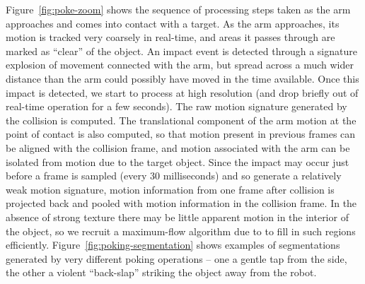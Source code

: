 



Figure~\ref{fig:poke-zoom} shows the sequence of processing steps
taken as the arm approaches and comes into contact with a target.  As
the arm approaches, its motion is tracked very coarsely in real-time,
and areas it passes through are marked as ``clear'' of the object.  An impact event
is detected through a signature explosion of movement connected with
the arm, but spread across a much wider distance than the arm could
possibly have moved in the time available.  Once this impact is detected, we
start to process at high resolution (and drop briefly out of real-time
operation for a few seconds).  The raw motion signature generated by
the collision is computed.  The translational component of the arm
motion at the point of contact is also computed, so that motion present in
previous frames can be aligned with the collision frame, and motion 
associated with the arm can be isolated from motion
due to the target object.  Since the impact may occur just before a
frame is sampled (every 30 milliseconds) and so generate a relatively
weak motion signature, motion information from one frame after
collision is projected back and pooled with motion information in the
collision frame.  In the absence of strong texture there may be little apparent motion
 in the interior of the object, so we recruit a maximum-flow
algorithm due to \cite{boykov01experimental} to fill in such regions
efficiently.
%
Figure~\ref{fig:poking-segmentation} shows examples of segmentations
generated by very different poking operations -- one a gentle
tap from the side, the other a violent ``back-slap'' striking
the object away from the robot.

